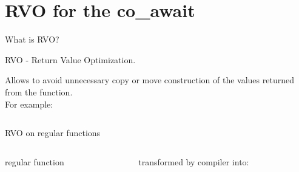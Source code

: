 \documentclass[10pt]{beamer}
\begin{document}
\section{RVO for the co\_await}

\begin{frame}{What is RVO?}
\centerline{\alert{RVO} - Return Value Optimization.}

\vfill

Allows to avoid unnecessary copy or move construction of the values returned from the function. \\
\pause
For example:

\inputminted[frame=single]{c++}{code-examples/RVO_examples/example.cpp}

\end{frame}

\begin{frame}[fragile]{RVO on regular functions}

\begin{columns}[T]
\begin{column}{0.4\linewidth}
\centerline{regular function}
\vfill
\inputminted{c++}{code-examples/RVO_examples/regular_function_rvo.cpp}
\vfill
\end{column}
\begin{column}{0.55\linewidth}
\centerline{transformed by compiler into:}
\vfill
\inputminted{c++}{code-examples/RVO_examples/transformed_function_rvo.cpp}
\vfill
\end{column}
\end{columns}

\end{frame}
\end{document}
